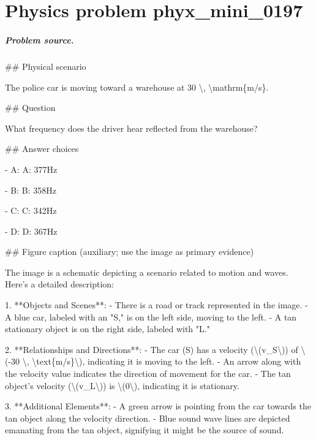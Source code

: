 
\chapter{Physics problem phyx\_mini\_0197}
\label{ch:PhyXMiniProblems_problem_phyx_mini_0197}

\paragraph{Problem source.}
\#\# Physical scenario

The police car is moving toward a warehouse at 30 \textbackslash{}, \textbackslash{}mathrm\{m/s\}.

\#\# Question

What frequency does the driver hear reflected from the warehouse?

\#\# Answer choices

- A: A: 377Hz

- B: B: 358Hz

- C: C: 342Hz

- D: D: 367Hz

\#\# Figure caption (auxiliary; use the image as primary evidence)

The image is a schematic depicting a scenario related to motion and waves. Here's a detailed description:

1. **Objects and Scenes**:
   - There is a road or track represented in the image.
   - A blue car, labeled with an "S," is on the left side, moving to the left.
   - A tan stationary object is on the right side, labeled with "L."

2. **Relationships and Directions**:
   - The car (S) has a velocity (\textbackslash{}(v\_S\textbackslash{})) of \textbackslash{}(-30 \textbackslash{}, \textbackslash{}text\{m/s\}\textbackslash{}), indicating it is moving to the left.
   - An arrow along with the velocity value indicates the direction of movement for the car.
   - The tan object's velocity (\textbackslash{}(v\_L\textbackslash{})) is \textbackslash{}(0\textbackslash{}), indicating it is stationary.

3. **Additional Elements**:
   - A green arrow is pointing from the car towards the tan object along the velocity direction.
   - Blue sound wave lines are depicted emanating from the tan object, signifying it might be the source of sound.

